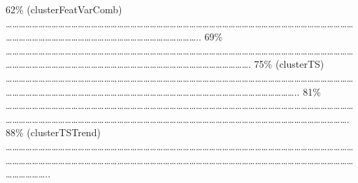 \documentclass[
]{article}
\begin{document}
\textbar{} 62\% (clusterFeatVarComb) \textbar{}
\textbar\ldots\ldots\ldots\ldots\ldots\ldots\ldots\ldots\ldots\ldots\ldots\ldots\ldots\ldots\ldots\ldots\ldots\ldots\ldots\ldots\ldots\ldots\ldots\ldots\ldots\ldots\ldots\ldots\ldots\ldots\ldots\ldots\ldots\ldots\ldots\ldots\ldots\ldots\ldots\ldots\ldots\ldots\ldots\ldots\ldots\ldots\ldots\ldots\ldots\ldots\ldots\ldots\ldots\ldots\ldots\ldots\ldots\ldots\ldots\ldots\ldots\ldots\ldots\ldots\ldots\ldots\ldots\ldots\ldots\ldots\ldots\ldots\ldots\ldots\ldots\ldots\ldots\ldots\ldots\ldots\ldots\ldots..
\textbar{} 69\% \textbar{}
\textbar\ldots\ldots\ldots\ldots\ldots\ldots\ldots\ldots\ldots\ldots\ldots\ldots\ldots\ldots\ldots\ldots\ldots\ldots\ldots\ldots\ldots\ldots\ldots\ldots\ldots\ldots\ldots\ldots\ldots\ldots\ldots\ldots\ldots\ldots\ldots\ldots\ldots\ldots\ldots\ldots\ldots\ldots\ldots\ldots\ldots\ldots\ldots\ldots\ldots\ldots\ldots\ldots\ldots\ldots\ldots\ldots\ldots\ldots\ldots\ldots\ldots\ldots\ldots\ldots\ldots\ldots\ldots\ldots\ldots\ldots\ldots\ldots\ldots\ldots\ldots\ldots\ldots\ldots\ldots\ldots\ldots\ldots\ldots\ldots\ldots\ldots\ldots\ldots\ldots\ldots.
\textbar{} 75\% (clusterTS) \textbar{}
\textbar\ldots\ldots\ldots\ldots\ldots\ldots\ldots\ldots\ldots\ldots\ldots\ldots\ldots\ldots\ldots\ldots\ldots\ldots\ldots\ldots\ldots\ldots\ldots\ldots\ldots\ldots\ldots\ldots\ldots\ldots\ldots\ldots\ldots\ldots\ldots\ldots\ldots\ldots\ldots\ldots\ldots\ldots\ldots\ldots\ldots\ldots\ldots\ldots\ldots\ldots\ldots\ldots\ldots\ldots\ldots\ldots\ldots\ldots\ldots\ldots\ldots\ldots\ldots\ldots\ldots\ldots\ldots\ldots\ldots\ldots\ldots\ldots\ldots\ldots\ldots\ldots\ldots\ldots\ldots\ldots\ldots\ldots\ldots\ldots\ldots\ldots\ldots\ldots\ldots\ldots\ldots\ldots\ldots\ldots\ldots\ldots\ldots..
\textbar{} 81\% \textbar{}
\textbar\ldots\ldots\ldots\ldots\ldots\ldots\ldots\ldots\ldots\ldots\ldots\ldots\ldots\ldots\ldots\ldots\ldots\ldots\ldots\ldots\ldots\ldots\ldots\ldots\ldots\ldots\ldots\ldots\ldots\ldots\ldots\ldots\ldots\ldots\ldots\ldots\ldots\ldots\ldots\ldots\ldots\ldots\ldots\ldots\ldots\ldots\ldots\ldots\ldots\ldots\ldots\ldots\ldots\ldots\ldots\ldots\ldots\ldots\ldots\ldots\ldots\ldots\ldots\ldots\ldots\ldots\ldots\ldots\ldots\ldots\ldots\ldots\ldots\ldots\ldots\ldots\ldots\ldots\ldots\ldots\ldots\ldots\ldots\ldots\ldots\ldots\ldots\ldots\ldots\ldots\ldots\ldots\ldots\ldots\ldots\ldots\ldots\ldots\ldots\ldots\ldots\ldots\ldots\ldots\ldots.
\textbar{} 88\% (clusterTSTrend) \textbar{}
\textbar\ldots\ldots\ldots\ldots\ldots\ldots\ldots\ldots\ldots\ldots\ldots\ldots\ldots\ldots\ldots\ldots\ldots\ldots\ldots\ldots\ldots\ldots\ldots\ldots\ldots\ldots\ldots\ldots\ldots\ldots\ldots\ldots\ldots\ldots\ldots\ldots\ldots\ldots\ldots\ldots\ldots\ldots\ldots\ldots\ldots\ldots\ldots\ldots\ldots\ldots\ldots\ldots\ldots\ldots\ldots\ldots\ldots\ldots\ldots\ldots\ldots\ldots\ldots\ldots\ldots\ldots\ldots\ldots\ldots\ldots\ldots\ldots\ldots\ldots\ldots\ldots\ldots\ldots\ldots\ldots\ldots\ldots\ldots\ldots\ldots\ldots\ldots\ldots\ldots\ldots\ldots\ldots\ldots\ldots\ldots\ldots\ldots\ldots\ldots\ldots\ldots\ldots\ldots\ldots\ldots\ldots\ldots\ldots\ldots\ldots\ldots\ldots..
\end{document}
